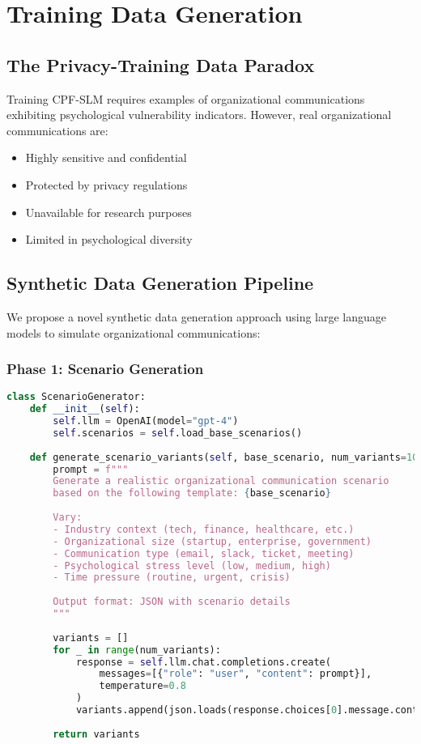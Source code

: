 \documentclass[11pt,a4paper]{article}
\begin{document}
\section{Training Data Generation}

\subsection{The Privacy-Training Data Paradox}

Training CPF-SLM requires examples of organizational communications exhibiting psychological vulnerability indicators. However, real organizational communications are:
\begin{itemize}
\item Highly sensitive and confidential
\item Protected by privacy regulations
\item Unavailable for research purposes
\item Limited in psychological diversity
\end{itemize}

\subsection{Synthetic Data Generation Pipeline}

We propose a novel synthetic data generation approach using large language models to simulate organizational communications:

\subsubsection{Phase 1: Scenario Generation}

\begin{lstlisting}[language=Python, caption=Scenario Generation]
class ScenarioGenerator:
    def __init__(self):
        self.llm = OpenAI(model="gpt-4")
        self.scenarios = self.load_base_scenarios()
        
    def generate_scenario_variants(self, base_scenario, num_variants=100):
        prompt = f"""
        Generate a realistic organizational communication scenario
        based on the following template: {base_scenario}
        
        Vary:
        - Industry context (tech, finance, healthcare, etc.)
        - Organizational size (startup, enterprise, government)
        - Communication type (email, slack, ticket, meeting)
        - Psychological stress level (low, medium, high)
        - Time pressure (routine, urgent, crisis)
        
        Output format: JSON with scenario details
        """
        
        variants = []
        for _ in range(num_variants):
            response = self.llm.chat.completions.create(
                messages=[{"role": "user", "content": prompt}],
                temperature=0.8
            )
            variants.append(json.loads(response.choices[0].message.content))
        
        return variants
\end{lstlisting}
\end{document}
